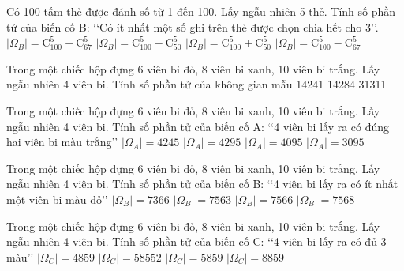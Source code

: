 \begin{ex}
Có 100 tấm thẻ được đánh số từ 1 đến 100. Lấy ngẫu nhiên 5 thẻ. Tính số phần tử của biến cố B: \lq\lq  Có ít nhất một số ghi trên thẻ được chọn chia hết cho 3\rq\rq .
\choice
{$|\Omega_B|=\mathrm{C}_{100}^5+\mathrm{C}_{67}^5$}
{$|\Omega_B|=\mathrm{C}_{100}^5-\mathrm{C}_{50}^5$}
{$|\Omega_B|=\mathrm{C}_{100}^5+\mathrm{C}_{50}^5$}
{\True $|\Omega_B|=\mathrm{C}_{100}^5-\mathrm{C}_{67}^5$}
\end{ex}
\begin{ex}
Trong một chiếc hộp đựng 6 viên bi đỏ, 8 viên bi xanh, 10 viên bi trắng. Lấy ngẫu nhiên 4 viên bi. Tính số phần tử của không gian mẫu
\choice
{}
{14241}
{14284}
{31311}
\end{ex}
\begin{ex}
Trong một chiếc hộp đựng 6 viên bi đỏ, 8 viên bi xanh, 10 viên bi trắng. Lấy ngẫu nhiên 4 viên bi. Tính số phần tử của biến cố A: \lq\lq  4 viên bi lấy ra có đúng hai viên bi màu trắng\rq\rq 
\choice
{$|\Omega_A|=4245$}
{$|\Omega_A|=4295$}
{\True $|\Omega_A|=4095$}
{$|\Omega_A|=3095$}
\end{ex}
\begin{ex}
Trong một chiếc hộp đựng 6 viên bi đỏ, 8 viên bi xanh, 10 viên bi trắng. Lấy ngẫu nhiên 4 viên bi. Tính số phần tử của biến cố B: \lq\lq  4 viên bi lấy ra có ít nhất một viên bi màu đỏ\rq\rq 
\choice
{$|\Omega_B|=7366$}
{$|\Omega_B|=7563$}
{\True $|\Omega_B|=7566$}
{$|\Omega_B|=7568$}
\end{ex}
\begin{ex}
Trong một chiếc hộp đựng 6 viên bi đỏ, 8 viên bi xanh, 10 viên bi trắng. Lấy ngẫu nhiên 4 viên bi. Tính số phần tử của biến cố C: \lq\lq  4 viên bi lấy ra có đủ 3 màu\rq\rq 
\choice
{$|\Omega_C|=4859$}
{$|\Omega_C|=58552$}
{\True $|\Omega_C|=5859$}
{$|\Omega_C|=8859$}
\end{ex}
